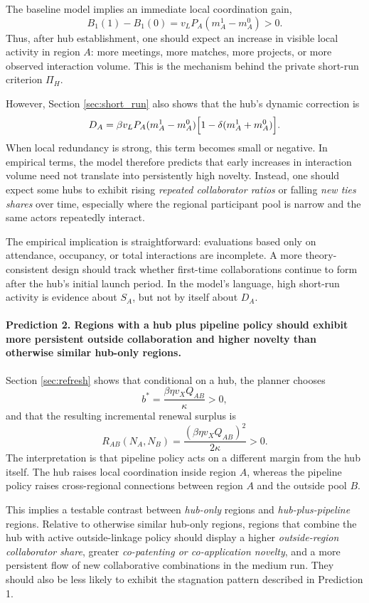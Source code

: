 The baseline model implies an immediate local coordination gain,
\[
B_1(1)-B_1(0)=v_LP_A(m_A^1-m_A^0)>0.
\]
Thus, after hub establishment, one should expect an increase in visible local activity in region $A$: more meetings, more matches, more projects, or more observed interaction volume. This is the mechanism behind the private short-run criterion $\Pi_H$.

However, Section \ref{sec:short_run} also shows that the hub's dynamic correction is
\[
D_A=\beta v_LP_A(m_A^1-m_A^0)\Bigl[1-\delta(m_A^1+m_A^0)\Bigr].
\]
When local redundancy is strong, this term becomes small or negative. In empirical terms, the model therefore predicts that early increases in interaction volume need not translate into persistently high novelty. Instead, one should expect some hubs to exhibit rising \emph{repeated collaborator ratios} or falling \emph{new ties shares} over time, especially where the regional participant pool is narrow and the same actors repeatedly interact.

The empirical implication is straightforward: evaluations based only on attendance, occupancy, or total interactions are incomplete. A more theory-consistent design should track whether first-time collaborations continue to form after the hub's initial launch period. In the model's language, high short-run activity is evidence about $S_A$, but not by itself about $D_A$.

\paragraph{Prediction 2. Regions with a hub plus pipeline policy should exhibit more persistent outside collaboration and higher novelty than otherwise similar hub-only regions.}

Section \ref{sec:refresh} shows that conditional on a hub, the planner chooses
\[
b^*=\frac{\beta\eta v_XQ_{AB}}{\kappa}>0,
\]
and that the resulting incremental renewal surplus is
\[
R_{AB}(N_A,N_B)=\frac{(\beta\eta v_XQ_{AB})^2}{2\kappa}>0.
\]
The interpretation is that pipeline policy acts on a different margin from the hub itself. The hub raises local coordination inside region $A$, whereas the pipeline policy raises cross-regional connections between region $A$ and the outside pool $B$.

This implies a testable contrast between \emph{hub-only} regions and \emph{hub-plus-pipeline} regions. Relative to otherwise similar hub-only regions, regions that combine the hub with active outside-linkage policy should display a higher \emph{outside-region collaborator share}, greater \emph{co-patenting or co-application novelty}, and a more persistent flow of new collaborative combinations in the medium run. They should also be less likely to exhibit the stagnation pattern described in Prediction 1.

